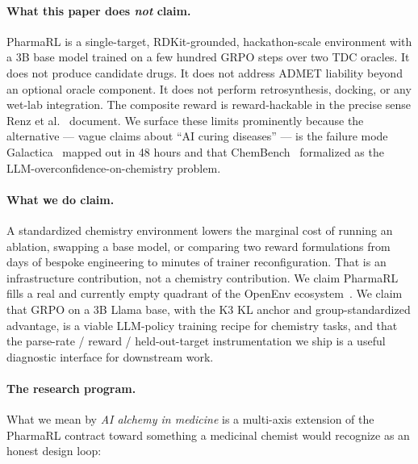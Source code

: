 \documentclass[11pt,a4paper]{article}
\begin{document}
\paragraph{What this paper does \emph{not} claim.} PharmaRL is a single-target, RDKit-grounded, hackathon-scale environment with a 3B base model trained on a few hundred GRPO steps over two TDC oracles. It does not produce candidate drugs. It does not address ADMET liability beyond an optional oracle component. It does not perform retrosynthesis, docking, or any wet-lab integration. The composite reward is reward-hackable in the precise sense Renz et al.~\cite{renz2020failure} document. We surface these limits prominently because the alternative --- vague claims about ``AI curing diseases'' --- is the failure mode Galactica~\cite{taylor2022galactica} mapped out in 48 hours and that ChemBench~\cite{mirza2025chembench} formalized as the LLM-overconfidence-on-chemistry problem.

\paragraph{What we do claim.} A standardized chemistry environment lowers the marginal cost of running an ablation, swapping a base model, or comparing two reward formulations from days of bespoke engineering to minutes of trainer reconfiguration. That is an infrastructure contribution, not a chemistry contribution. We claim PharmaRL fills a real and currently empty quadrant of the OpenEnv ecosystem~\cite{metaopenenv2025}. We claim that GRPO on a 3B Llama base, with the K3 KL anchor and group-standardized advantage, is a viable LLM-policy training recipe for chemistry tasks, and that the parse-rate / reward / held-out-target instrumentation we ship is a useful diagnostic interface for downstream work.

\paragraph{The research program.} What we mean by \emph{AI alchemy in medicine} is a multi-axis extension of the PharmaRL contract toward something a medicinal chemist would recognize as an honest design loop:
\end{document}

